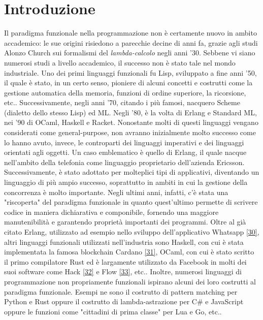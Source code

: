 \documentclass[10pt,a4paper]{article}
\begin{document}
\textwidth=450pt\oddsidemargin=0pt

\tableofcontents
\newpage

\section{Introduzione}
Il paradigma funzionale nella programmazione non è certamente nuovo in ambito accademico: le sue origini risiedono a
parecchie decine di anni fa, grazie agli studi Alonzo Church sui formalismi del \textit{lambda-calcolo} negli anni '30.
Sebbene vi siano numerosi studi a livello accademico, il successo non è stato tale nel mondo industriale. Uno dei primi
linguaggi funzionali fu Lisp, sviluppato a fine anni '50, il quale è stato, in un certo senso,
pioniere di alcuni concetti e costrutti come la gestione automatica della memoria, funzioni di ordine superiore, la
ricorsione, etc.. Successivamente, negli anni '70, citando i più famosi, nacquero Scheme (dialetto dello stesso Lisp) ed ML.
Negli '80, è la volta di Erlang e Standard ML, nei '90 di OCaml, Haskell e Racket. Nonostante molti di questi linguaggi
vengano considerati come general-purpose, non avranno inizialmente molto successo come lo hanno avuto, invece, le
controparti dei linguaggi imperativi e dei linguaggi orientati agli oggetti. Un caso emblematico è quello di
Erlang, il quale nacque nell'ambito della telefonia come linguaggio proprietario dell'azienda Ericsson. Successivamente,
è stato adottato per molteplici tipi di applicativi, diventando un linguaggio di più ampio successo, soprattutto in ambiti
in cui la gestione della concorrenza è molto importante. Negli ultimi anni, infatti, c'è stata una "riscoperta" del
paradigma funzionale in quanto quest'ultimo permette di scrivere codice in maniera dichiarativa e componibile, fornendo
una maggiore manutenibilità e garantendo proprietà importanti dei programmi. Oltre al già citato Erlang, utilizzato ad
esempio nello sviluppo dell'applicativo Whatsapp \hyperlink{bibl30}{[30]}, altri linguaggi funzionali utilizzati
nell'industria sono Haskell, con cui è stata implementata la famosa blockchain Cardano
\hyperlink{bibl31}{[31]}, OCaml, con cui è stato scritto il primo compilatore Rust ed è largamente utilizzato da Facebook
in molti dei suoi software come Hack
\hyperlink{bibl32}{[32]} e Flow \hyperlink{bibl33}{[33]}, etc.. Inoltre, numerosi linguaggi di programmazione non
propriamente funzionali ispirano alcuni dei loro costrutti al paradigma funzionale. Esempi ne sono il costrutto di
pattern matching per Python e Rust oppure il costrutto di lambda-astrazione per C\# e JavaScript oppure le
funzioni come "cittadini di prima classe" per Lua e Go, etc..
\end{document}
